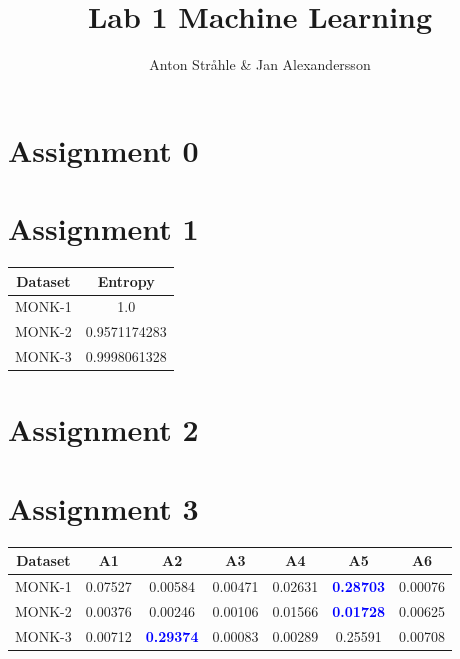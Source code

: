 \documentclass{article}
\begin{document}
\title{Lab 1 Machine Learning}
\author{Anton Stråhle \& Jan Alexandersson}
\maketitle 

\section*{Assignment 0}

\section*{Assignment 1}

\begin{center}
 \begin{tabular}{|c | c|} 
 \hline
 Dataset & Entropy  \\ [0.5ex] 
 \hline \hline
 MONK-1 & 1.0 \\ 
 MONK-2 & 0.9571174283 \\ 
 MONK-3 & 0.9998061328 \\ [1ex] 
 \hline
\end{tabular}
\end{center}


\section*{Assignment 2}

\section*{Assignment 3}

\begin{center}
 \begin{tabular}{|c | c c c c c c |} 
 \hline
 Dataset & A1 & A2 & A3 & A4 & A5 & A6 \\ [0.5ex] 
 \hline \hline
 MONK-1 & 0.07527 & 0.00584 & 0.00471 & 0.02631 & \textcolor{blue}{\textbf{0.28703}} & 0.00076 \\ 
 MONK-2 & 0.00376 & 0.00246 & 0.00106 & 0.01566 & \textcolor{blue}{\textbf{0.01728}} & 0.00625 \\ 
 MONK-3 & 0.00712 & \textcolor{blue}{\textbf{0.29374}} & 0.00083 & 0.00289 & 0.25591 & 0.00708  \\ [1ex] 
 \hline
\end{tabular}
\end{center}
\end{document}
